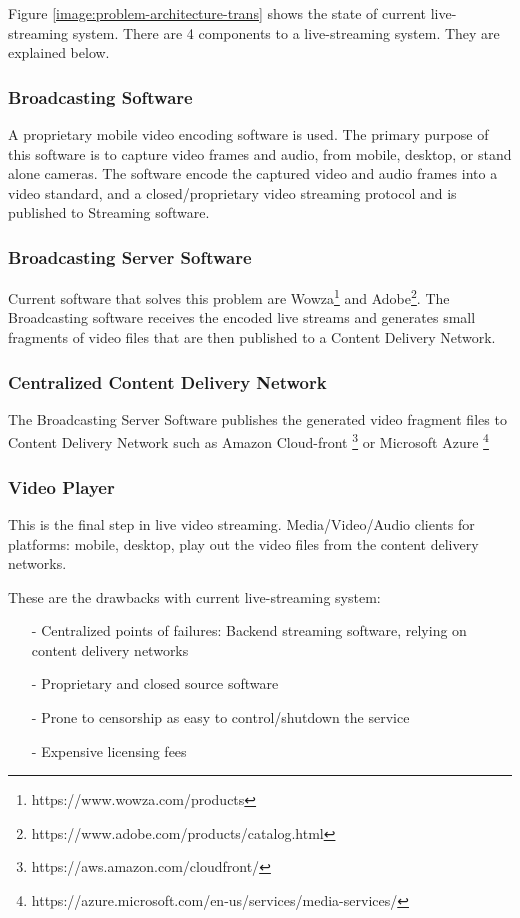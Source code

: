\documentclass{article}
\begin{document}
Figure \ref{image:problem-architecture-trans} shows the state of current live-streaming system. There are 4 components to a live-streaming system. They are explained below.
\subsubsection{Broadcasting Software}
A proprietary mobile video encoding software is used. The primary purpose of this software is to capture video frames and audio, from mobile, desktop, or stand alone cameras. The software encode the captured video and audio frames into a video standard, and a closed/proprietary video streaming protocol and is published to Streaming software.

\subsubsection{Broadcasting Server Software}
Current software that solves this problem are Wowza\footnote{https://www.wowza.com/products} and Adobe\footnote{https://www.adobe.com/products/catalog.html}. The Broadcasting software receives the encoded live streams and generates small fragments of video files that are then published to a Content Delivery Network.

\subsubsection{Centralized Content Delivery Network}
The Broadcasting Server Software publishes the generated video fragment files to Content Delivery Network such as Amazon Cloud-front \footnote{https://aws.amazon.com/cloudfront/} or Microsoft Azure \footnote{https://azure.microsoft.com/en-us/services/media-services/}

\subsubsection{Video Player}
This is the final step in live video streaming. Media/Video/Audio clients for platforms: mobile, desktop, play out the video files from the content delivery networks.


These are the drawbacks with current live-streaming system:
\begin{itemize}
 \item[-]Centralized points of failures: Backend streaming software, relying on content delivery networks
 \item[-]Proprietary and closed source software
 \item[-]Prone to censorship as easy to control/shutdown the service
 \item[-]Expensive licensing fees
\end{itemize}
\end{document}
